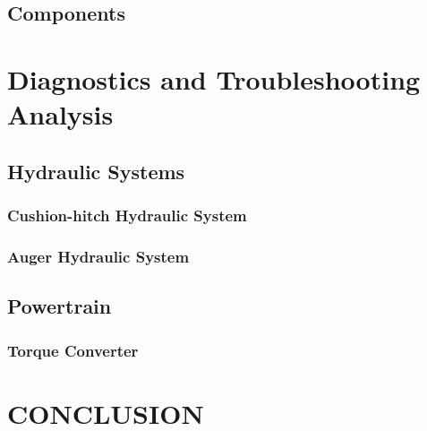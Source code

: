 \documentclass[a4paper,man,natbib]{apa6}
\begin{document}
\subsection{Components}

\section{Diagnostics and Troubleshooting Analysis}

\subsection{Hydraulic Systems}

\subsubsection{Cushion-hitch Hydraulic System}

\subsubsection{Auger Hydraulic System}

\subsection{Powertrain}

\subsubsection{Torque Converter}

\section{CONCLUSION}


\end{document}
